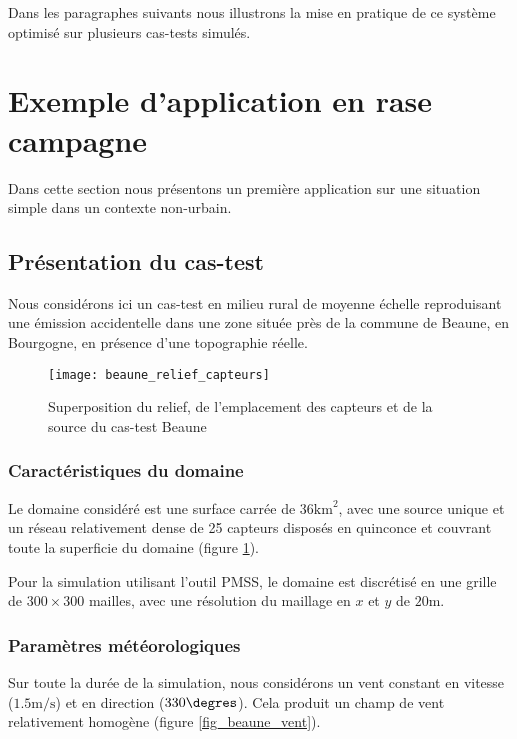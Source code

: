 Dans les paragraphes suivants nous illustrons la mise en pratique de ce système optimisé sur plusieurs cas-tests simulés. \\



\section{Exemple d'application en rase campagne}

Dans cette section nous présentons un première application sur une situation  simple dans un contexte non-urbain.

\subsection{Présentation du cas-test}

Nous considérons ici un cas-test en milieu rural de moyenne échelle reproduisant une émission accidentelle dans une zone située près de la commune de Beaune, en Bourgogne, en présence d'une topographie réelle. 

\begin{figure}[h!]
	\centering
	\texttt{[image: beaune\_relief\_capteurs]}
	\caption{Superposition du relief, de l'emplacement des capteurs et de la source du cas-test Beaune}
	\label{fig_beaune_relief}
\end{figure}

\subsubsection{Caractéristiques du domaine}

Le domaine considéré est une surface carrée de $36 \text{km}^2$, avec une source unique et un réseau relativement dense de 25 capteurs disposés en quinconce et couvrant toute la superficie du domaine (figure \ref{fig_beaune_relief}).



Pour la simulation utilisant l'outil PMSS, le domaine est discrétisé en une grille de $300 \times 300$ mailles, avec une résolution du maillage en $x$ et $y$ de $20\text{m}$. 

\subsubsection{Paramètres météorologiques}

Sur toute la durée de la simulation, nous considérons un vent constant en vitesse ($1.5\text{m/s}$) et en direction ($330\degres$). Cela produit un champ de vent relativement homogène (figure \ref{fig_beaune_vent}).

